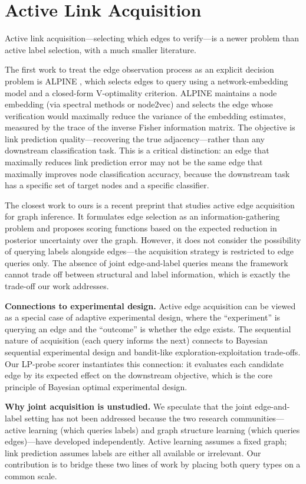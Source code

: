 \documentclass[12pt,a4paper,oneside]{report}
\begin{document}
\section{Active Link Acquisition}

Active link acquisition---selecting which edges to verify---is a newer problem than active label selection, with a much smaller literature.

The first work to treat the edge observation process as an explicit decision problem is ALPINE \citep{alpine}, which selects edges to query using a network-embedding model and a closed-form V-optimality criterion. ALPINE maintains a node embedding (via spectral methods or node2vec) and selects the edge whose verification would maximally reduce the variance of the embedding estimates, measured by the trace of the inverse Fisher information matrix. The objective is link prediction quality---recovering the true adjacency---rather than any downstream classification task. This is a critical distinction: an edge that maximally reduces link prediction error may not be the same edge that maximally improves node classification accuracy, because the downstream task has a specific set of target nodes and a specific classifier.

The closest work to ours is a recent preprint \citep{scout} that studies active edge acquisition for graph inference. It formulates edge selection as an information-gathering problem and proposes scoring functions based on the expected reduction in posterior uncertainty over the graph. However, it does not consider the possibility of querying labels alongside edges---the acquisition strategy is restricted to edge queries only. The absence of joint edge-and-label queries means the framework cannot trade off between structural and label information, which is exactly the trade-off our work addresses.

\textbf{Connections to experimental design.} Active edge acquisition can be viewed as a special case of adaptive experimental design, where the ``experiment'' is querying an edge and the ``outcome'' is whether the edge exists. The sequential nature of acquisition (each query informs the next) connects to Bayesian sequential experimental design and bandit-like exploration-exploitation trade-offs. Our LP-probe scorer instantiates this connection: it evaluates each candidate edge by its expected effect on the downstream objective, which is the core principle of Bayesian optimal experimental design.

\textbf{Why joint acquisition is unstudied.} We speculate that the joint edge-and-label setting has not been addressed because the two research communities---active learning (which queries labels) and graph structure learning (which queries edges)---have developed independently. Active learning assumes a fixed graph; link prediction assumes labels are either all available or irrelevant. Our contribution is to bridge these two lines of work by placing both query types on a common scale.
\end{document}
